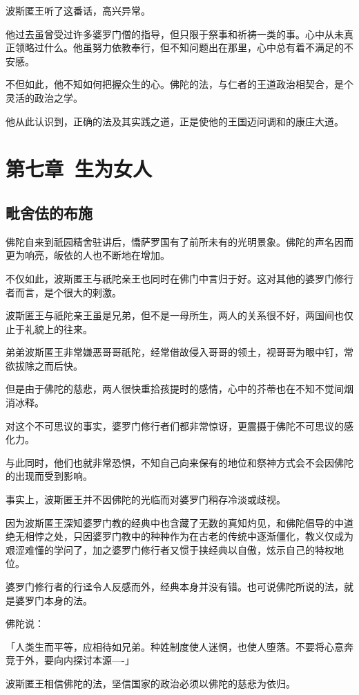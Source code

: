 \documentclass[twoside,openany]{book}
\begin{document}
波斯匿王听了这番话，高兴异常。

他过去虽曾受过许多婆罗门僧的指导，但只限于祭事和祈祷一类的事。心中从未真正领略过什么。他虽努力依教奉行，但不知问题出在那里，心中总有着不满足的不安感。

不但如此，他不知如何把握众生的心。佛陀的法，与仁者的王道政治相契合，是个灵活的政治之学。

他从此认识到，正确的法及其实践之道，正是使他的王国迈问调和的康庄大道。

\chapter{第七章\ 生为女人}\label{ch7}

\section{毗舍佉的布施}\label{sec7.1}

佛陀自来到祇园精舍驻讲后，憍萨罗国有了前所未有的光明景象。佛陀的声名因而更为响亮，皈依的人也不断地在增加。

不仅如此，波斯匿王与祇陀亲王也同时在佛门中言归于好。这对其他的婆罗门修行者而言，是个很大的剌激。

波斯匿王与祇陀亲王虽是兄弟，但不是一母所生，两人的关系很不好，两国间也仅止于礼貌上的往来。

弟弟波斯匿王非常嫌恶哥哥祇陀，经常借故侵入哥哥的领土，视哥哥为眼中钉，常欲拔除之而后快。

但是由于佛陀的慈悲，两人很快重拾孩提时的感情，心中的芥蒂也在不知不觉间烟消冰释。

对这个不可思议的事实，婆罗门修行者们都非常惊讶，更震摄于佛陀不可思议的感化力。

与此同时，他们也就非常恐惧，不知自己向来保有的地位和祭神方式会不会因佛陀的出现而受到影响。

事实上，波斯匿王并不因佛陀的光临而对婆罗门稍存冷淡或歧视。

因为波斯匿王深知婆罗门教的经典中也含藏了无数的真知灼见，和佛陀倡导的中道绝无相悖之处，只因婆罗门教中的种种作为在古老的传统中逐渐僵化，教义仅成为艰涩难懂的学问了，加之婆罗门修行者又惯于挟经典以自傲，炫示自己的特权地位。

婆罗门修行者的行迳令人反感而外，经典本身并没有错。也可说佛陀所说的法，就是婆罗门本身的法。

佛陀说：

「人类生而平等，应相待如兄弟。种姓制度使人迷惘，也使人堕落。不要将心意奔竞于外，要向内探讨本源----」

波斯匿王相信佛陀的法，坚信国家的政治必须以佛陀的慈悲为依归。
\end{document}
